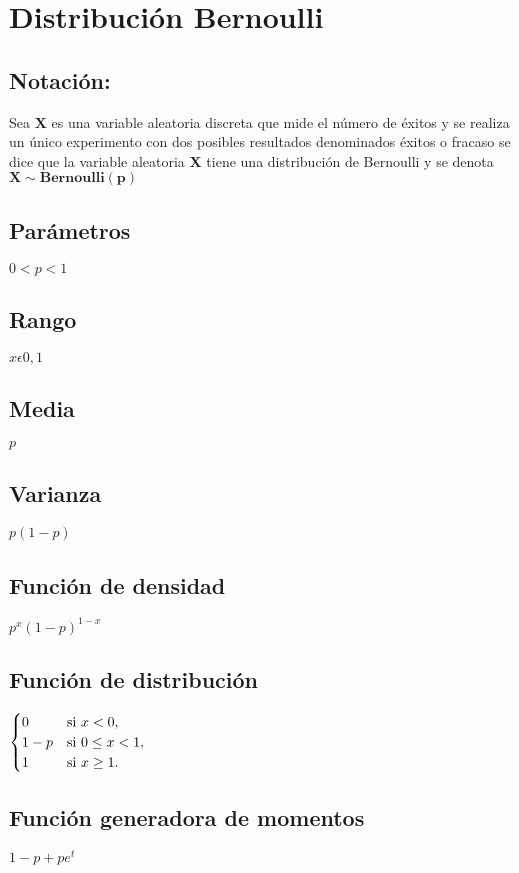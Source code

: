 \documentclass[es-lat]{article}
\begin{document}
\section{Distribución Bernoulli}
\subsection{Notación:}

Sea $\mathbf{X}$ es una variable aleatoria discreta que mide el número de éxitos y se realiza un único experimento con dos posibles resultados denominados éxitos o fracaso se dice que la variable aleatoria $\mathbf{X}$ tiene una distribución de Bernoulli y se denota $\mathbf{X\sim Bernoulli(p)}$

\subsection{Parámetros}
$0<p<1$

\subsection{Rango}
$x\epsilon{0,1}$

\subsection{Media}
$p$

\subsection{Varianza}
$p(1-p)$

\subsection{Función de densidad}
$p^{x}(1-p)^{1-x}$

\subsection{Función de distribución}
$\begin{cases}
  \begin{array}{@{}l@{\quad}l}
    0 & \text{si } x < 0, \\
    1-p & \text{si } 0 \leq  x < 1, \\
    1 & \text{si } x \geq 1.
  \end{array}
\end{cases}$

\subsection{Función generadora de momentos}
$1-p+pe^{t}$
\end{document}
